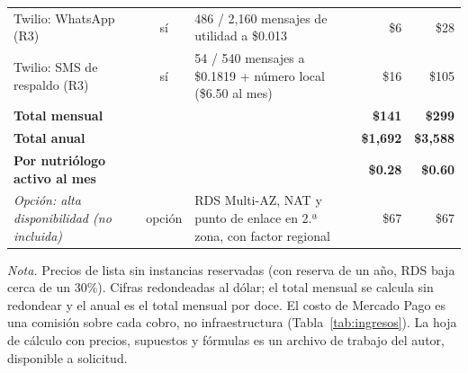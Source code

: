 \documentclass[12pt, a4paper]{article}
\begin{document}
\begin{table}[!htbp]
\begin{tabularx}{\textwidth}{p{3.4cm} c X r r}
    Twilio: WhatsApp (R3) & sí & 486 / 2,160 mensajes de utilidad a \$0.013 & \$6 & \$28 \\
    Twilio: SMS de respaldo (R3) & sí & 54 / 540 mensajes a \$0.1819 + número local (\$6.50 al mes) & \$16 & \$105 \\
    \midrule
    \textbf{Total mensual} & & & \textbf{\$141} & \textbf{\$299} \\
    \textbf{Total anual} & & & \textbf{\$1,692} & \textbf{\$3,588} \\
    \textbf{Por nutriólogo activo al mes} & & & \textbf{\$0.28} & \textbf{\$0.60} \\
    \midrule
    \textit{Opción: alta disponibilidad (no incluida)} & opción & RDS Multi-AZ, NAT y punto de enlace en 2.ª zona, con factor regional & \$67 & \$67 \\
    \bottomrule
  \end{tabularx}
  \begin{flushleft}
    \footnotesize\textit{Nota.} Precios de lista sin instancias reservadas (con
    reserva de un año, RDS baja cerca de un 30\%). Cifras redondeadas al
    dólar; el total mensual se calcula sin redondear y el anual es el
    total mensual por doce. El costo de Mercado Pago es una comisión sobre cada cobro, no infraestructura (Tabla~\ref{tab:ingresos}).
    La hoja de cálculo con precios, supuestos y
    fórmulas es un archivo de trabajo del autor, disponible a solicitud.
  \end{flushleft}
\end{table}
 
\end{document}

